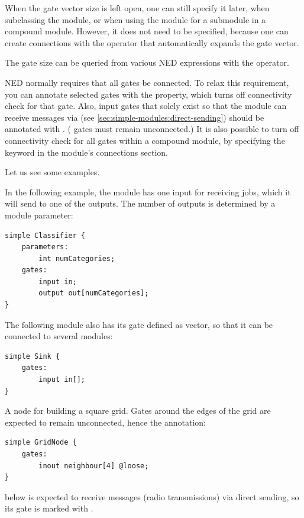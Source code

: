 When the gate vector size is left open, one can still specify it later,
when subclassing the module, or when using the module for a submodule in a
compound module. However, it does not need to be specified, because
one can create connections with the  operator that
automatically expands the gate vector.

The gate size can be queried from various NED expressions with the
 operator.

NED normally requires that all gates be connected. To relax this
requirement, you can annotate selected gates with the 
property, which turns off connectivity check for that gate. Also, input
gates that solely exist so that the module can receive messages via
 (see \ref{sec:simple-modules:direct-sending}) should
be annotated with . ( gates must remain
unconnected.) It is also possible to turn off connectivity check for all
gates within a compound module, by specifying the
 keyword in the module's connections section.

Let us see some examples.

In the following example, the  module has one input for
receiving jobs, which it will send to one of the outputs. The number of
outputs is determined by a module parameter:

\begin{verbatim}
simple Classifier {
    parameters:
        int numCategories;
    gates:
        input in;
        output out[numCategories];
}
\end{verbatim}

The following  module also has its  gate defined
as vector, so that it can be connected to several modules:

\begin{verbatim}
simple Sink {
    gates:
        input in[];
}
\end{verbatim}

A node for building a square grid. Gates around the edges of the grid are
expected to remain unconnected, hence the  annotation:

\begin{verbatim}
simple GridNode {
    gates:
        inout neighbour[4] @loose;
}
\end{verbatim}

 below is expected to receive messages (radio transmissions)
via direct sending, so its  gate is marked with .

